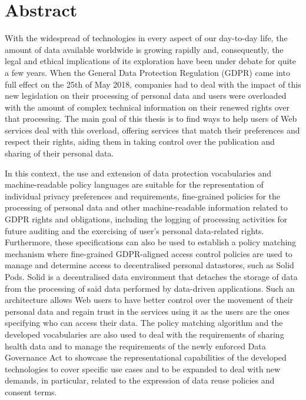 %

\section*{Abstract}
\label{sec::abstract}


With the widespread of technologies in every aspect of our day-to-day life, the amount of data available worldwide is growing rapidly and, consequently, the legal and ethical implications of its exploration have been under debate for quite a few years.
When the General Data Protection Regulation (GDPR) came into full effect on the 25th of May 2018, companies had to deal with the impact of this new legislation on their processing of personal data and users were overloaded with the amount of complex technical information on their renewed rights over that processing.
The main goal of this thesis is to find ways to help users of Web services deal with this overload, offering services that match their preferences and respect their rights, aiding them in taking control over the publication and sharing of their personal data.

In this context, the use and extension of data protection vocabularies and machine-readable policy languages are suitable for the representation of individual privacy preferences and requirements, fine-grained policies for the processing of personal data and other machine-readable information related to GDPR rights and obligations, including the logging of processing activities for future auditing and the exercising of user's personal data-related rights.
Furthermore, these specifications can also be used to establish a policy matching mechanism where fine-grained GDPR-aligned access control policies are used to manage and determine access to decentralised personal datastores, such as Solid Pods.
Solid is a decentralised data environment that detaches the storage of data from the processing of said data performed by data-driven applications.
Such an architecture allows Web users to have better control over the movement of their personal data and regain trust in the services using it as the users are the ones specifying who can access their data.
The policy matching algorithm and the developed vocabularies are also used to deal with the requirements of sharing health data and to manage the requirements of the newly enforced Data Governance Act to showcase the representational capabilities of the developed technologies to cover specific use cases and to be expanded to deal with new demands, in particular, related to the expression of data reuse policies and consent terms.

